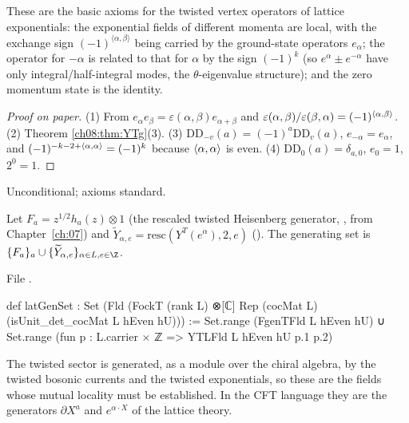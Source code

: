 \begin{physics}
These are the basic axioms for the twisted vertex operators of lattice exponentials: the exponential fields of different momenta are local, with the exchange sign $(-1)^{\langle\alpha,\beta\rangle}$ being carried by the ground-state operators $e_\alpha$; the operator for $-\alpha$ is related to that for $\alpha$ by the sign $(-1)^k$ (so $e^\alpha\pm e^{-\alpha}$ have only integral/half-integral modes, the $\theta$-eigenvalue structure); and the zero momentum state is the identity.
\end{physics}
\begin{proof}[Proof on paper]
(1) From $e_\alpha e_\beta=\varepsilon(\alpha,\beta)e_{\alpha+\beta}$ and
$\varepsilon(\alpha,\beta)/\varepsilon(\beta,\alpha)=(-1)^{\langle \alpha,\beta\rangle}$.  (2) Theorem
\ref{ch08:thm:YTg}(3).  (3) $\mathrm{DD}_{-v}(a)=(-1)^a\mathrm{DD}_v(a)$, $e_{-\alpha}=e_\alpha$,
and $(-1)^{-k-2+\langle \alpha,\alpha\rangle}=(-1)^k$ because $\langle \alpha,\alpha\rangle$ is even.
(4) $\mathrm{DD}_0(a)=\delta_{a,0}$, $e_0=1$, $2^0=1$.
\end{proof}
\begin{status}
Unconditional; axioms standard.
\end{status}

\begin{definition}\label{ch08:def:latGenSet}
Let $F_a=z^{1/2}h_a(z)\otimes1$ (the rescaled twisted Heisenberg generator, , from
Chapter~\ref{ch:07}) and $\widetilde Y_{\alpha,e}=\mathrm{resc}(Y^T(e^\alpha),2,e)$
().  The generating set is $\{F_a\}_a\cup\{\widetilde Y_{\alpha,e}\}_{\alpha\in L,e\in\Z}$.
\end{definition}
\noindent File .
\begin{leancode}
def latGenSet : Set (Fld (FockT (rank L) ⊗[ℂ] Rep (cocMat L) (isUnit_det_cocMat L hEven hU))) :=
  Set.range (FgenTFld L hEven hU) ∪ Set.range (fun p : L.carrier × ℤ => YTLFld L hEven hU p.1 p.2)
\end{leancode}

\begin{physics}
The twisted sector is generated, as a module over the chiral algebra, by the twisted bosonic currents and the twisted exponentials, so these are the fields whose mutual locality must be established. In the CFT language they are the generators $\partial X^a$ and $e^{\alpha\cdot X}$ of the lattice theory.
\end{physics}

